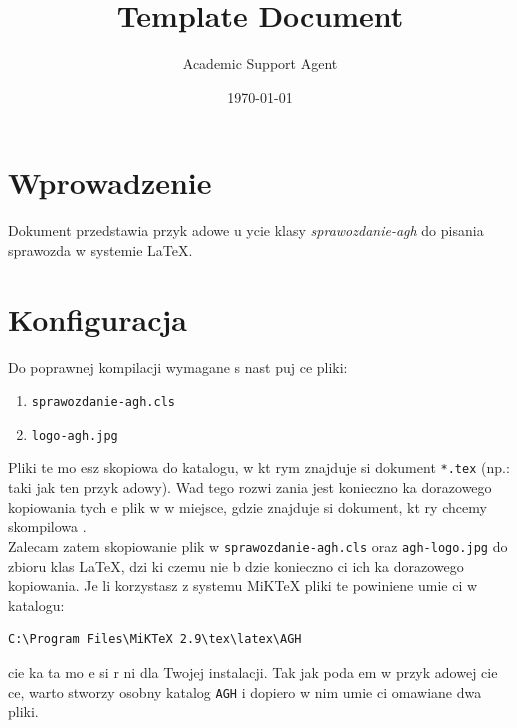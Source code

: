 \documentclass{article}
\title{Template Document}
\author{Academic Support Agent}
\date{\today}
\begin{document}
\maketitle


\stronatytulowa{}

\section{Wprowadzenie}

Dokument przedstawia przyk adowe u ycie klasy \emph{sprawozdanie-agh} do pisania sprawozda  w systemie \LaTeX.

\section{Konfiguracja}

Do poprawnej kompilacji wymagane s  nast puj ce pliki:
\begin{enumerate}
\item \texttt{sprawozdanie-agh.cls}
\item \texttt{logo-agh.jpg}
\end{enumerate}

Pliki te mo esz skopiowa  do katalogu, w kt rym znajduje si  dokument \texttt{*.tex} (np.: taki jak ten przyk adowy). Wad  tego rozwi zania jest konieczno  ka dorazowego kopiowania tych e plik w w miejsce, gdzie znajduje si  dokument, kt ry chcemy skompilowa .\\
Zalecam zatem skopiowanie plik w \texttt{sprawozdanie-agh.cls} oraz \texttt{agh-logo.jpg} do zbioru klas \LaTeX, dzi ki czemu nie b dzie konieczno ci ich ka dorazowego kopiowania. Je li korzystasz z systemu MiKTeX pliki te powiniene  umie ci  w katalogu:
\begin{lstlisting}
C:\Program Files\MiKTeX 2.9\tex\latex\AGH
\end{lstlisting}
 cie ka ta mo e si  r ni  dla Twojej instalacji. Tak jak poda em w przyk adowej  cie ce, warto stworzy  osobny katalog \texttt{AGH} i dopiero w nim umie ci  omawiane dwa pliki.
\end{document}
